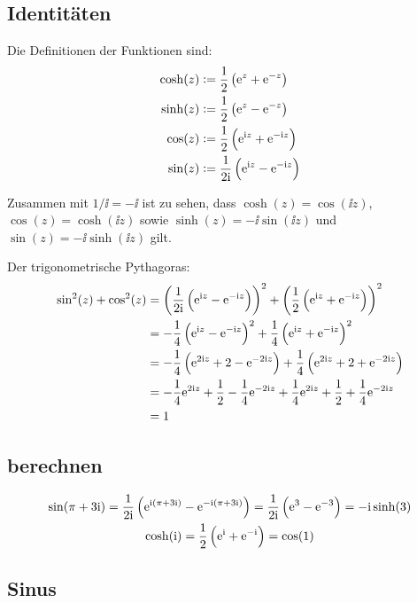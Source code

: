 \subsection{Identitäten}

Die Definitionen der Funktionen sind:
\begin{align*}
	\cosh(z) &:= \frac 1{2} \del{\ee^{z} + \ee^{-z}} \\
	\sinh(z) &:= \frac 1{2} \del{\ee^{z} - \ee^{-z}} \\
	\cos(z) &:= \frac 1{2} \del{\ee^{\ii z} + \ee^{-\ii z}} \\
	\sin(z) &:= \frac 1{2 \ii} \del{\ee^{\ii z} - \ee^{-\ii z}}
\end{align*}

Zusammen mit $1/\ii = - \ii$ ist zu sehen, dass $\cosh(z) = \cos(\ii z)$,
$\cos(z) = \cosh(\ii z)$ sowie $\sinh(z) = - \ii \sin(\ii z)$ und $\sin(z) = -
\ii \sinh(\ii z)$ gilt.

Der trigonometrische Pythagoras:
\begin{align*}
	\sin^2(z) + \cos^2(z)
	&= \del{\frac 1{2 \ii} \del{\ee^{\ii z} - \ee^{-\ii z}}}^2 + \del{\frac 1{2} \del{\ee^{\ii z} + \ee^{-\ii z}}}^2 \\
	&= - \frac 14 \del{\ee^{\ii z} - \ee^{-\ii z}}^2 + \frac 14 \del{\ee^{\ii z} + \ee^{-\ii z}}^2 \\
	&= - \frac 14 \del{\ee^{2 \ii z} + 2 - \ee^{-2 \ii z}} + \frac 14 \del{\ee^{2 \ii z} + 2 + \ee^{-2 \ii z}} \\
	&= - \frac 14 \ee^{2 \ii z} + \frac 12 - \frac 14 \ee^{-2 \ii z} + \frac 14 \ee^{2 \ii z} + \frac 12 + \frac 14 \ee^{-2 \ii z} \\
	&= 1
\end{align*}

\subsection{berechnen}

\begin{gather*}
	\sin(\pi + 3 \ii)
	= \frac 1{2 \ii} \del{\ee^{\ii \del{\pi + 3 \ii}} - \ee^{-\ii \del{\pi + 3 \ii}}}
	= \frac 1{2 \ii} \del{\ee^{3} - \ee^{-3}}
	= - \ii \sinh(3) \\
	\cosh(\ii)
	= \frac 1{2} \del{\ee^{\ii} + \ee^{-\ii}}
	= \cos(1)
\end{gather*}

\subsection{Sinus}

